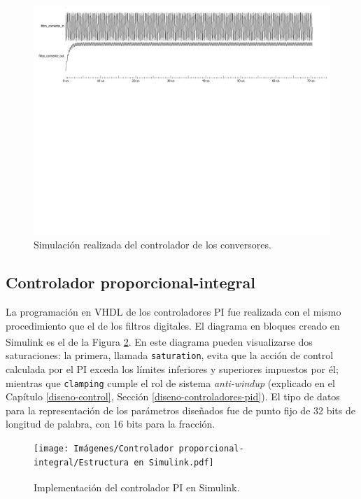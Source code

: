 \begin{figure}[hbt!]
    \centering
    \includegraphics[width=0.85\columnwidth]{Imágenes/Filtro digital/Simulación en ModelSim.pdf}    
    \caption{Simulación realizada del controlador de los conversores.}
    \label{simulacion-filtro}
\end{figure} 

\subsection{Controlador proporcional-integral}
\label{implementacion-pid}

La programación en VHDL de los controladores PI fue realizada con el mismo procedimiento que el de los filtros digitales. El diagrama en bloques creado en Simulink\textsuperscript\textregistered\hspace{0.05pt} es el de la Figura \ref{estructura-pi}. En este diagrama pueden visualizarse dos saturaciones: la primera, llamada \texttt{saturation}, evita que la acción de control calculada por el PI exceda los límites inferiores y superiores impuestos por él; mientras que \texttt{clamping} cumple el rol de sistema \emph{anti-windup} (explicado en el Capítulo \ref{diseno-control}, Sección \ref{diseno-controladores-pid}). El tipo de datos para la representación de los parámetros diseñados fue de punto fijo de 32 bits de longitud de palabra, con 16 bits para la fracción.

\begin{figure}[hbt!]
    \centering
    \texttt{[image: Imágenes/Controlador proporcional-integral/Estructura en Simulink.pdf]}    
    \caption{Implementación del controlador PI en Simulink\textsuperscript\textregistered.}
    \label{estructura-pi}
\end{figure}

